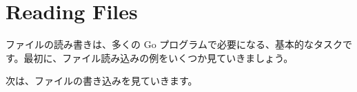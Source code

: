 \section{Reading Files}

ファイルの読み書きは、多くの Go プログラムで必要になる、基本的なタスクです。最初に、ファイル読み込みの例をいくつか見ていきましょう。




次は、ファイルの書き込みを見ていきます。